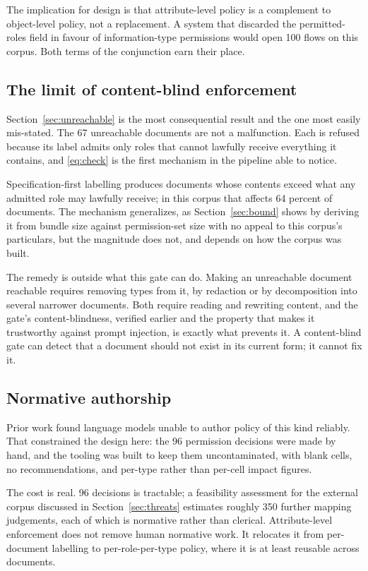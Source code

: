 \documentclass[conference]{IEEEtran}
\begin{document}
The implication for design is that attribute-level policy is a complement to
object-level policy, not a replacement. A system that discarded the
permitted-roles field in favour of information-type permissions would open 100
flows on this corpus. Both terms of the conjunction earn their place.

\subsection{The limit of content-blind enforcement}
\label{sec:limit}
Section~\ref{sec:unreachable} is the most consequential result and the one most
easily mis-stated. The 67 unreachable documents are not a malfunction. Each is
refused because its label admits only roles that cannot lawfully receive
everything it contains, and \eqref{eq:check} is the first mechanism in the
pipeline able to notice.

Specification-first labelling produces documents whose contents exceed what any
admitted role may lawfully receive; in this corpus that affects 64 percent of
documents. The mechanism generalizes, as Section~\ref{sec:bound} shows by
deriving it from bundle size against permission-set size with no appeal to this
corpus's particulars, but the magnitude does not, and depends on how the corpus
was built.

The remedy is outside what this gate can do. Making an unreachable document
reachable requires removing types from it, by redaction or by decomposition into
several narrower documents. Both require reading and rewriting content, and the
gate's content-blindness, verified earlier and the property that makes it
trustworthy against prompt injection, is exactly what prevents it. A
content-blind gate can detect that a document should not exist in its current
form; it cannot fix it.

\subsection{Normative authorship}
Prior work \cite{b4} found language models unable to author policy of this kind
reliably. That constrained the design here: the 96 permission decisions were
made by hand, and the tooling was built to keep them uncontaminated, with blank
cells, no recommendations, and per-type rather than per-cell impact figures.

The cost is real. 96 decisions is tractable; a feasibility assessment for the
external corpus discussed in Section~\ref{sec:threats} estimates roughly 350
further mapping judgements, each of which is normative rather than clerical.
Attribute-level enforcement does not remove human normative work. It relocates
it from per-document labelling to per-role-per-type policy, where it is at least
reusable across documents.
\end{document}

